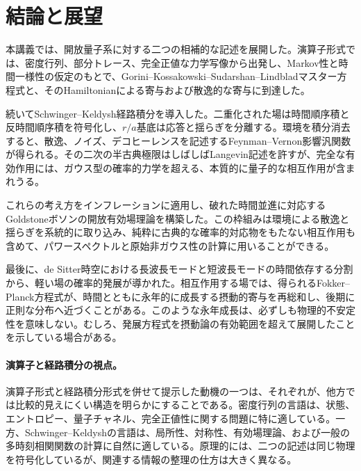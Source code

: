 \documentclass[a4paper,11pt,oneside]{article}
\theoremstyle{definition}
\numberwithin{equation}{section}
\begin{document}
\section{結論と展望}




本講義では、開放量子系に対する二つの相補的な記述を展開した。演算子形式では、密度行列、部分トレース、完全正値な力学写像から出発し、Markov性と時間一様性の仮定のもとで、Gorini--Kossakowski--Sudarshan--Lindbladマスター方程式と、そのHamiltonianによる寄与および散逸的な寄与に到達した。



続いてSchwinger--Keldysh経路積分を導入した。二重化された場は時間順序積と反時間順序積を符号化し、\(r/a\)基底は応答と揺らぎを分離する。環境を積分消去すると、散逸、ノイズ、デコヒーレンスを記述するFeynman--Vernon影響汎関数が得られる。その二次の半古典極限はしばしばLangevin記述を許すが、完全な有効作用には、ガウス型の確率的力学を超える、本質的に量子的な相互作用が含まれうる。



これらの考え方をインフレーションに適用し、破れた時間並進に対応するGoldstoneボソンの開放有効場理論を構築した。この枠組みは環境による散逸と揺らぎを系統的に取り込み、純粋に古典的な確率的対応物をもたない相互作用も含めて、パワースペクトルと原始非ガウス性の計算に用いることができる。



最後に、de Sitter時空における長波長モードと短波長モードの時間依存する分割から、軽い場の確率的発展が導かれた。相互作用する場では、得られるFokker--Planck方程式が、時間とともに永年的に成長する摂動的寄与を再総和し、後期に正則な分布へ近づくことがある。このような永年成長は、必ずしも物理的不安定性を意味しない。むしろ、発展方程式を摂動論の有効範囲を超えて展開したことを示している場合がある。



\paragraph{演算子と経路積分の視点。}



演算子形式と経路積分形式を併せて提示した動機の一つは、それぞれが、他方では比較的見えにくい構造を明らかにすることである。密度行列の言語は、状態、エントロピー、量子チャネル、完全正値性に関する問題に特に適している。一方、Schwinger--Keldyshの言語は、局所性、対称性、有効場理論、および一般の多時刻相関関数の計算に自然に適している。原理的には、二つの記述は同じ物理を符号化しているが、関連する情報の整理の仕方は大きく異なる。
\end{document}
